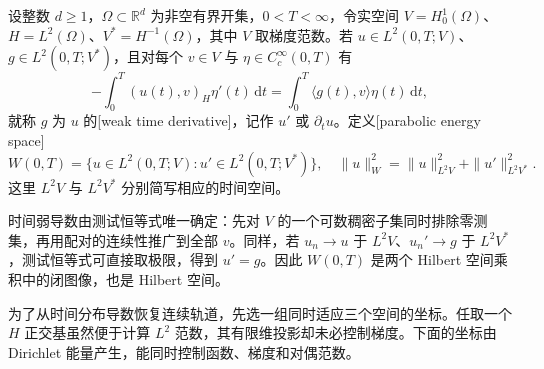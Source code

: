 \begin{definition}[时间弱导数与能量空间]\label{b2:def:D6-energy-space}
设整数 \(d\geq1\)，\(\Omega\subset\mathbb R^d\) 为非空有界开集，\(0<T<\infty\)，令实空间 \(V=H_0^1(\Omega)\)、\(H=L^2(\Omega)\)、\(V^*=H^{-1}(\Omega)\)，其中 \(V\) 取梯度范数。若 \(u\in L^2(0,T;V)\)、\(g\in L^2(0,T;V^*)\)，且对每个 \(v\in V\) 与 \(\eta\in C_c^\infty(0,T)\) 有
\[
 -\int_0^T(u(t),v)_H\eta'(t)\,\mathrm dt
 =\int_0^T\langle g(t),v\rangle\eta(t)\,\mathrm dt,
\]
就称 \(g\) 为 \(u\) 的[weak time derivative]，记作 \(u'\) 或 \(\partial_tu\)。定义[parabolic energy space]
\[
 W(0,T)=\{u\in L^2(0,T;V):u'\in L^2(0,T;V^*)\},
 \quad
 \|u\|_W^2=\|u\|_{L^2V}^2+\|u'\|_{L^2V^*}^2.
\]
这里 \(L^2V\) 与 \(L^2V^*\) 分别简写相应的时间空间。
\end{definition}
时间弱导数由测试恒等式唯一确定：先对 \(V\) 的一个可数稠密子集同时排除零测集，再用配对的连续性推广到全部 \(v\)。同样，若 \(u_n\to u\) 于 \(L^2V\)、\(u_n'\to g\) 于 \(L^2V^*\)，测试恒等式可直接取极限，得到 \(u'=g\)。因此 \(W(0,T)\) 是两个 Hilbert 空间乘积中的闭图像，也是 Hilbert 空间。

\ProseParagraphBreak

为了从时间分布导数恢复连续轨道，先选一组同时适应三个空间的坐标。任取一个 \(H\) 正交基虽然便于计算 \(L^2\) 范数，其有限维投影却未必控制梯度。下面的坐标由 Dirichlet 能量产生，能同时控制函数、梯度和对偶范数。

